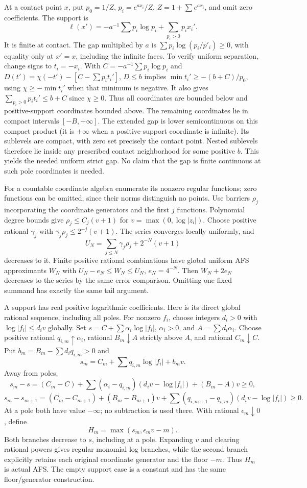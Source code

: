 \documentclass[
  10pt,
]{article}
\begin{document}
At a contact point \(x\), put \(p_0=1/Z\), \(p_i=e^{ax_i}/Z\),
\(Z=1+\sum e^{ax_i}\), and omit zero coefficients. The support is
\[\ell(x')=-a^{-1}\sum p_i\log p_i+\sum_{p_i>0}p_ix_i'.\] It is finite
at contact. The gap multiplied by \(a\) is
\(\sum p_i\log(p_i/p'_i)\ge0\), with equality only at \(x'=x\),
including the infinite faces. To verify uniform separation, change signs
to \(t_i=-x_i\). With \(C=-a^{-1}\sum p_i\log p_i\) and
\(D(t')=\chi(-t')-[C-\sum p_it_i']\), \(D\le b\) implies
\(\min t_i'\ge-(b+C)/p_0\), using \(\chi\ge-\min t_i'\) when that
minimum is negative. It also gives \(\sum_{p_i>0}p_it_i'\le b+C\) since
\(\chi\ge0\). Thus all coordinates are bounded below and
positive-support coordinates bounded above. The remaining coordinates
lie in compact intervals \([-B,+\infty]\). The extended gap is lower
semicontinuous on this compact product (it is \(+\infty\) when a
positive-support coordinate is infinite). Its sublevels are compact,
with zero set precisely the contact point. Nested sublevels therefore
lie inside any prescribed contact neighborhood for some positive \(b\).
This yields the needed uniform strict gap. No claim that the gap is
finite continuous at such pole coordinates is needed.

For a countable coordinate algebra enumerate its nonzero regular
functions; zero functions can be omitted, since their norms distinguish
no points. Use barriers \(\rho_j\) incorporating the coordinate
generators and the first \(j\) functions. Polynomial degree bounds give
\(\rho_j\le C_j(v+1)\) for \(v=\max(0,\log|z_i|)\). Choose positive
rational \(\gamma_j\) with \(\gamma_j\rho_j\le2^{-j}(v+1)\). The series
converges locally uniformly, and
\[U_N=\sum_{j\le N}\gamma_j\rho_j+2^{-N}(v+1)\] decreases to it. Finite
positive rational combinations have global uniform AFS approximants
\(W_N\) with \(U_N-e_N\le W_N\le U_N\), \(e_N=4^{-N}\). Then
\(W_N+2e_N\) decreases to the series by the same error comparison.
Omitting one fixed summand has exactly the same tail argument.

A support has real positive logarithmic coefficients. Here is its direct
global rational sequence, including all poles. For nonzero \(f_i\),
choose integers \(d_i>0\) with \(\log|f_i|\le d_iv\) globally. Set
\(s=C+\sum\alpha_i\log|f_i|\), \(\alpha_i>0\), and
\(A=\sum d_i\alpha_i\). Choose positive rational
\(q_{i,m}\uparrow\alpha_i\), rational \(B_m\downarrow A\) strictly above
\(A\), and rational \(C_m\downarrow C\). Put
\(b_m=B_m-\sum d_iq_{i,m}>0\) and
\[s_m=C_m+\sum q_{i,m}\log|f_i|+b_mv.\] Away from poles,
\[s_m-s=(C_m-C)+\sum(\alpha_i-q_{i,m})(d_iv-\log|f_i|)+(B_m-A)v\ge0,\]
\[s_m-s_{m+1}=(C_m-C_{m+1})+(B_m-B_{m+1})v
             +\sum(q_{i,m+1}-q_{i,m})(d_iv-\log|f_i|)\ge0.\] At a pole
both have value \(-\infty\); no subtraction is used there. With rational
\(\epsilon_m\downarrow0\), define \[H_m=\max(s_m,\epsilon_mv-m).\] Both
branches decrease to \(s\), including at a pole. Expanding \(v\) and
clearing rational powers gives regular monomial log branches, while the
second branch explicitly retains each original coordinate generator and
the floor \(-m\). Thus \(H_m\) is actual AFS. The empty support case is
a constant and has the same floor/generator construction.
\end{document}
